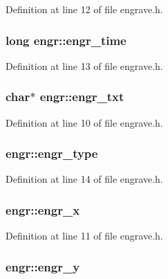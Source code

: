 Definition at line 12 of file engrave.\+h.

\hypertarget{structengr_a24a00a252c90a7d237647e9c27567343}{
\subsubsection[{engr\+\_\+time}]{\setlength{\rightskip}{0pt plus 5cm}long engr\+::engr\+\_\+time}}\label{structengr_a24a00a252c90a7d237647e9c27567343}


Definition at line 13 of file engrave.\+h.

\hypertarget{structengr_a95db64d2b9fd73b172acb8e5c6144d8f}{
\subsubsection[{engr\+\_\+txt}]{\setlength{\rightskip}{0pt plus 5cm}char$\ast$ engr\+::engr\+\_\+txt}}\label{structengr_a95db64d2b9fd73b172acb8e5c6144d8f}


Definition at line 10 of file engrave.\+h.

\hypertarget{structengr_ab1fa44428e7ffd9afd521ade75da2f51}{
\subsubsection[{engr\+\_\+type}]{ engr\+::engr\+\_\+type}}\label{structengr_ab1fa44428e7ffd9afd521ade75da2f51}


Definition at line 14 of file engrave.\+h.

\hypertarget{structengr_a5a1194317671c2bfc8f39aa959c14bf3}{
\subsubsection[{engr\+\_\+x}]{ engr\+::engr\+\_\+x}}\label{structengr_a5a1194317671c2bfc8f39aa959c14bf3}


Definition at line 11 of file engrave.\+h.

\hypertarget{structengr_ac488abc6179daa205c494a8d629f6d35}{
\subsubsection[{engr\+\_\+y}]{ engr\+::engr\+\_\+y}}\label{structengr_ac488abc6179daa205c494a8d629f6d35}


